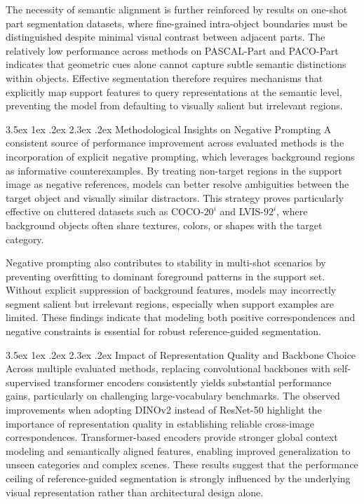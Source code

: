 \documentclass[journal,12pt,onecolumn,draftclsnofoot]{IEEEtran}
\makeatletter
\renewcommand{\section}{\@startsection{section}{1}{\z@}%
    {3.5ex \@plus 1ex \@minus .2ex}%
    {2.3ex \@plus.2ex}%
    {\normalfont\Large\bfseries}}
\makeatother
\begin{document}
The necessity of semantic alignment is further reinforced by results on one-shot part segmentation datasets, where fine-grained intra-object boundaries must be distinguished despite minimal visual contrast between adjacent parts. The relatively low performance across methods on PASCAL-Part and PACO-Part indicates that geometric cues alone cannot capture subtle semantic distinctions within objects. Effective segmentation therefore requires mechanisms that explicitly map support features to query representations at the semantic level, preventing the model from defaulting to visually salient but irrelevant regions.

\section{Methodological Insights on Negative Prompting}
A consistent source of performance improvement across evaluated methods is the incorporation of explicit negative prompting, which leverages background regions as informative counterexamples. By treating non-target regions in the support image as negative references, models can better resolve ambiguities between the target object and visually similar distractors. This strategy proves particularly effective on cluttered datasets such as COCO-$20^i$ and LVIS-$92^i$, where background objects often share textures, colors, or shapes with the target category.

Negative prompting also contributes to stability in multi-shot scenarios by preventing overfitting to dominant foreground patterns in the support set. Without explicit suppression of background features, models may incorrectly segment salient but irrelevant regions, especially when support examples are limited. These findings indicate that modeling both positive correspondences and negative constraints is essential for robust reference-guided segmentation.

\section{Impact of Representation Quality and Backbone Choice}
Across multiple evaluated methods, replacing convolutional backbones with self-supervised transformer encoders consistently yields substantial performance gains, particularly on challenging large-vocabulary benchmarks. The observed improvements when adopting DINOv2 instead of ResNet-50 highlight the importance of representation quality in establishing reliable cross-image correspondences. Transformer-based encoders provide stronger global context modeling and semantically aligned features, enabling improved generalization to unseen categories and complex scenes. These results suggest that the performance ceiling of reference-guided segmentation is strongly influenced by the underlying visual representation rather than architectural design alone.
\end{document}

